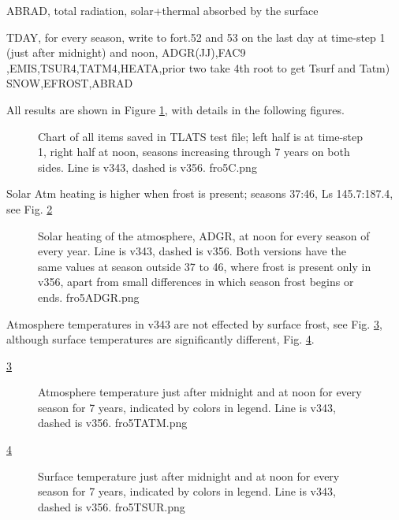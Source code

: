 \documentclass{article}
\begin{document}
ABRAD, total radiation, solar+thermal absorbed by the surface

TDAY, for every season, write to fort.52 and 53 on the last day at time-step 1
(just after midnight) and noon, ADGR(JJ),FAC9 ,EMIS,TSUR4,TATM4,HEATA,prior two
take 4th root to get Tsurf and Tatm) SNOW,EFROST,ABRAD

All results are shown in Figure \ref{fro5C}, with details in the following
figures.
\begin{figure}[!ht] 
\caption[Summary of run1 results]{Chart of all items saved in TLATS test file;
  left half is at time-step 1, right half at noon, seasons increasing through 7
  years on both sides. Line is v343, dashed is v356.
\label{fro5C}  fro5C.png }
\end{figure} 

Solar Atm heating is higher when frost is present; seasons 37:46, Ls
145.7:187.4, see Fig. \ref{fro5ADGR}

\begin{figure}[!ht] 
\caption[Run1 results for Solar heating of Atm. ]{Solar heating of the
  atmosphere, ADGR, at noon for every season of every year. Line is v343, dashed
  is v356. Both versions have the same values at season outside 37 to 46, where
  frost is present only in v356, apart from small differences in which season
  frost begins or ends.
\label{fro5ADGR}  fro5ADGR.png }
\end{figure} 

Atmosphere temperatures in v343 are not effected by surface frost, see
Fig. \ref{fro5TATM}, although surface temperatures are significantly different,
Fig. \ref{fro5TSUR}.

\ref{fro5TATM}
\begin{figure}[!ht] 
\caption[Run1 results for Atm. temperature]{Atmosphere temperature just after
  midnight and at noon for every season for 7 years, indicated by colors in
  legend. Line is v343, dashed is v356.
\label{fro5TATM}  fro5TATM.png }
\end{figure} 

\ref{fro5TSUR}
\begin{figure}[!ht] 
\caption[Run1 results for surface temperature ]{Surface temperature just after midnight and at noon for every season
  for 7 years, indicated by colors in legend. Line is v343, dashed is v356.
\label{fro5TSUR}  fro5TSUR.png }
\end{figure} 
\end{document}
